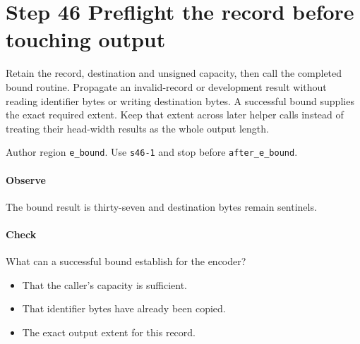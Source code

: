 \section{Step 46 Preflight the record before touching output}\label{cbor-s46}
Retain the record, destination and unsigned capacity, then call the completed bound routine. Propagate an invalid-record or development result without reading identifier bytes or writing destination bytes. A successful bound supplies the exact required extent. Keep that extent across later helper calls instead of treating their head-width results as the whole output length.

Author region \texttt{e\_bound}. Use \texttt{s46-1} and stop before \texttt{after\_e\_bound}.

\paragraph{Observe} The bound result is thirty-seven and destination bytes remain sentinels.

\paragraph{Check} What can a successful bound establish for the encoder?
\begin{itemize}
  \item[A.] That the caller's capacity is sufficient.
  \item[B.] That identifier bytes have already been copied.
  \item[C.] The exact output extent for this record.
\end{itemize}
